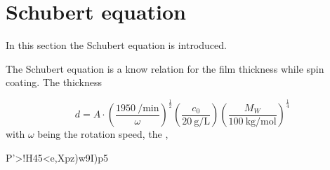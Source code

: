 \section{Schubert equation}
\label{sec:Schubert}

In this section the Schubert equation is introduced. 

The Schubert equation is a know relation for the film thickness while spin coating. The thickness 

\begin{equation}
    d = A \cdot (\frac{\SI{1950}{\per\minute}}{\omega})^\frac{1}{2} (\frac{c_0}{\SI{20}{\gram\per\liter}})(\frac{M_W}{\SI{100}{\kilo\gram\per \mol}})^\frac{1}{4}

\end{equation}
 with $\omega$ being the rotation speed, the , 

 P'>!H45<e,Xpz)w9I)p5
